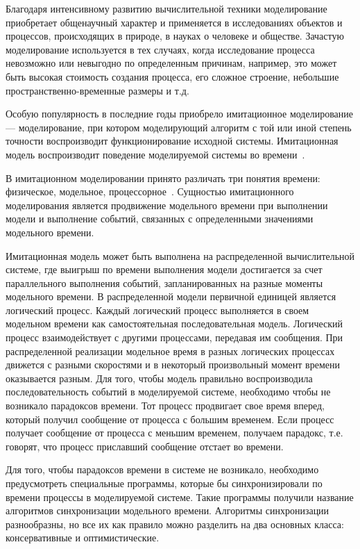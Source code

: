 
{\actuality} 
Благодаря интенсивному развитию вычислительной техники моделирование приобретает общенаучный характер и применяется в исследованиях объектов и процессов, происходящих в природе, в науках о человеке и обществе. Зачастую моделирование используется в тех случаях, когда исследование процесса невозможно или невыгодно по определенным причинам, например, это может быть высокая стоимость создания процесса, его сложное строение, небольшие пространственно-временные размеры и т.д.

Особую популярность в последние годы приобрело имитационное моделирование --- моделирование, при котором моделирующий алгоритм с той или иной степень точности воспроизводит функционирование исходной системы. Имитационная модель воспроизводит поведение моделируемой системы во времени~\cite{disksobmod}.

В имитационном моделировании принято различать три понятия времени: физическое, модельное, процессорное~\cite{voz-disser}. Сущностью имитационного моделирования является продвижение модельного времени при выполнении модели и выполнение событий, связанных с определенными значениями модельного времени.

Имитационная модель может быть выполнена на распределенной вычислительной системе, где выигрыш по времени выполнения модели достигается за счет параллельного выполнения событий, запланированных на разные моменты модельного времени. В распределенной модели первичной единицей является логический процесс. Каждый логический процесс выполняется в своем модельном времени как самостоятельная последовательная модель. Логический процесс взаимодействует с другими процессами, передавая им сообщения. При распределенной реализации модельное время в разных логических процессах движется с разными скоростями и в некоторый произвольный момент времени оказывается разным. Для того, чтобы модель правильно воспроизводила последовательность событий в моделируемой системе, необходимо чтобы не возникало парадоксов времени. Тот процесс продвигает свое время вперед, который получил сообщение от процесса с большим временем. Если процесс получает сообщение от процесса с меньшим временем, получаем парадокс, т.е. говорят, что процесс приславший сообщение  отстает во времени.

Для того, чтобы парадоксов времени в системе не возникало, необходимо предусмотреть специальные программы, которые бы синхронизировали по времени процессы в моделируемой системе. Такие программы получили название алгоритмов синхронизации модельного времени. Алгоритмы синхронизации разнообразны, но все их как правило можно разделить на два основных класса: консервативные и оптимистические.

